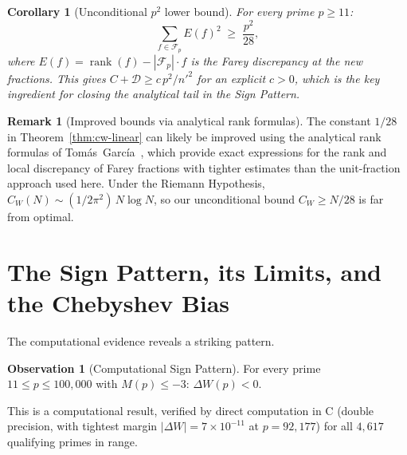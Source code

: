 \documentclass[11pt]{article}
\newtheorem{corollary}[theorem]{Corollary}
\theoremstyle{definition}
\newtheorem{remark}[theorem]{Remark}
\newtheorem{observation}[theorem]{Observation}
\newcommand{\F}{\mathcal{F}}
\DeclareMathOperator{\rank}{rank}
\begin{document}
\begin{corollary}[Unconditional $p^2$ lower bound]
For every prime $p \ge 11$:
\[
  \sum_{f \in \F_p} E(f)^2 \;\ge\; \frac{p^2}{28},
\]
where $E(f) = \rank(f) - |\F_p|\cdot f$ is the Farey
discrepancy at the new fractions.  This gives
$C + \mathcal{D} \ge c\,p^2/{n'}^2$ for an explicit $c > 0$,
which is the key ingredient for closing the analytical tail
in the Sign Pattern.
\end{corollary}

\begin{remark}[Improved bounds via analytical rank formulas]
The constant $1/28$ in Theorem~\ref{thm:cw-linear} can likely be improved
using the analytical rank formulas of Tom\'as~Garc\'ia~\cite{TomasGarcia2022, TomasGarcia2024, TomasGarcia2025},
which provide exact expressions for the rank and local discrepancy of Farey
fractions with tighter estimates than the unit-fraction approach used here.
Under the Riemann Hypothesis, $C_W(N) \sim (1/2\pi^2)\,N\log N$,
so our unconditional bound $C_W \ge N/28$ is far from optimal.
\end{remark}


\section{The Sign Pattern, its Limits, and the Chebyshev Bias}\label{sec:sign-theorem}

The computational evidence reveals a striking pattern.

\begin{observation}[Computational Sign Pattern]\label{thm:sign}
For every prime $11 \le p \le 100{,}000$ with $M(p) \le -3$:
$\Delta W(p) < 0$.
\end{observation}

\noindent This is a computational result, verified by direct
computation in C (double precision, with tightest margin
$|\Delta W| = 7 \times 10^{-11}$ at $p = 92{,}177$) for all
$4{,}617$ qualifying primes in range.
\end{document}

